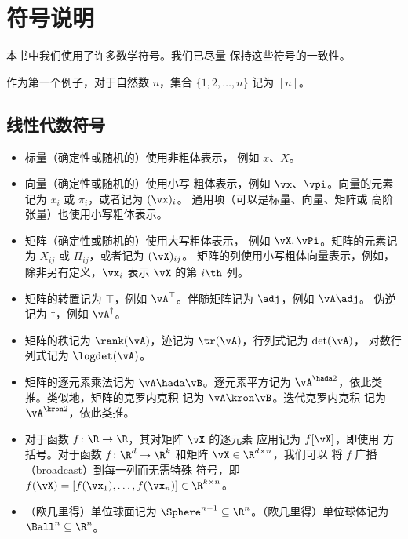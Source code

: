 \chapter*{符号说明}

本书中我们使用了许多数学符号。我们已尽量
保持这些符号的一致性。

作为第一个例子，对于自然数 \(n\)，集合 \(\{1, 2,
\dots, n\}\) 记为 \([n]\)。

\section*{线性代数符号}
\begin{itemize}
    \item 标量（确定性或随机的）使用非粗体表示，
        例如 \(x\)、\(X\)。
    \item 向量（确定性或随机的）使用小写
        粗体表示，例如 \(\vx\)、\(\vpi\)。向量的元素记为
        \(x_{i}\) 或 \(\pi_{i}\)，或者记为 \((\vx)_{i}\)。
        通用项（可以是标量、向量、矩阵或
        高阶张量）也使用小写粗体表示。
    \item 矩阵（确定性或随机的）使用大写粗体表示，
        例如 \(\vX, \vPi\)。矩阵的元素记为
        \(X_{ij}\) 或 \(\Pi_{ij}\)，或者记为 \((\vX)_{ij}\)。
        矩阵的列使用小写粗体向量表示，例如，
        除非另有定义，\(\vx_{i}\) 表示 \(\vX\) 的第 \(i\th\) 列。
    \item 矩阵的转置记为 \(\top\)，例如
        \(\vA^{\top}\)。伴随矩阵记为 \(\adj\)，例如 \(\vA\adj\)。
        伪逆记为 \(\dagger\)，例如 \(\vA^{\dagger}\)。
    \item 矩阵的秩记为 \(\rank(\vA)\)，迹记为
        \(\tr(\vA)\)，行列式记为 \(\det(\vA)\)，
        对数行列式记为 \(\logdet(\vA)\)。
    \item 矩阵的逐元素乘法记为 \(\vA \hada
        \vB\)。逐元素平方记为
        \(\vA^{\hada 2}\)，依此类推。类似地，矩阵的克罗内克积
        记为 \(\vA \kron \vB\)。迭代克罗内克积
        记为 \(\vA^{\kron 2}\)，依此类推。
    \item 对于函数 \(f \colon \R \to \R\)，其对矩阵 \(\vX\) 的逐元素
        应用记为 \(f[\vX]\)，即使用
        方括号。对于函数 \(f \colon \R^{d} \to
        \R^{k}\) 和矩阵 \(\vX \in \R^{d \times n}\)，我们可以
        将 \(f\) 广播（broadcast）到每一列而无需特殊
        符号，即 \(f(\vX) = [f(\vx_{1}), \dots, f(\vx_{n})]
        \in \R^{k \times n}\)。
    \item （欧几里得）单位球面记为 \(\Sphere^{n - 1} \subseteq
        \R^{n}\)。（欧几里得）单位球体记为 \(\Ball^{n} \subseteq \R^{n}\)。

\end{itemize}
